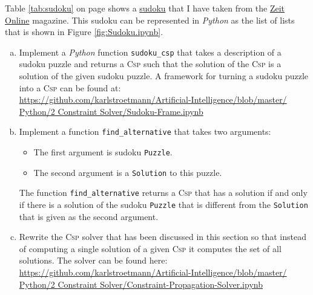 \exercise
{}
Table \ref{tab:sudoku} on page \pageref{tab:sudoku} shows a \href{https://en.wikipedia.org/wiki/Sudoku}{sudoku}
that I have taken from the
\href{http://sudoku.zeit.de/cgi-bin/sudoku/sudoku_kd_app_2016.pl?action=level&kd_nr=24091123601092&year=2018&month=03&day=23&level=-c+5}{Zeit Online}
magazine.  This sudoku can be represented in \textsl{Python} as the list of lists that is shown in Figure
\ref{fig:Sudoku.ipynb}. 
\begin{enumerate}[(a)]
\item Implement a \textsl{Python} function \texttt{sudoku\_csp} that takes a description of a sudoku puzzle
      and returns a \textsc{Csp} such that the solution of the \textsc{Csp} is a solution of the given sudoku puzzle.
      A framework for turning a sudoku puzzle into a \textsc{Csp} can be found at:
      \\[0.2cm]
      \hspace*{1.3cm}
      \href{https://github.com/karlstroetmann/Artificial-Intelligence/blob/master/Python/2 Constraint
        Solver/Sudoku-Frame.ipynb}{https://github.com/karlstroetmann/Artificial-Intelligence/blob/master/\\
      \hspace*{2.6cm}  
          Python/2 Constraint Solver/Sudoku-Frame.ipynb}
\item Implement a function \texttt{find\_alternative} that takes two arguments:
  \begin{itemize}
  \item The first argument is sudoku \texttt{Puzzle}.
  \item The second argument is a \texttt{Solution} to this puzzle.
  \end{itemize}
  The function \texttt{find\_alternative} returns a \textsc{Csp} that has a solution if and only if there is a
  solution of the sudoku \texttt{Puzzle} that is different from the \texttt{Solution} that is given as the second argument.
\item Rewrite the \textsc{Csp} solver that has been discussed in this section so that instead of computing a single
      solution of a given \textsc{Csp} it computes the set of all solutions. 
      The solver can be found here:
      \\[0.2cm]
      \hspace*{1.3cm}
      \href{https://github.com/karlstroetmann/Artificial-Intelligence/blob/master/Python/2 Constraint Solver/Constraint-Propagation-Solver.ipynb}{https://github.com/karlstroetmann/Artificial-Intelligence/blob/master/\\
      \hspace*{2.6cm}  
        Python/2 Constraint Solver/Constraint-Propagation-Solver.ipynb}    
\end{enumerate}

